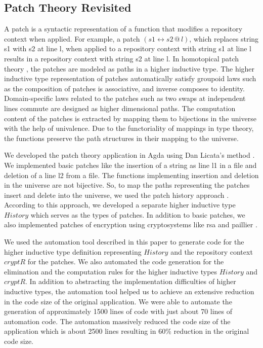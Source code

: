 \documentclass[sigplan,10pt]{acmart}
\begin{document}
\subsection{Patch Theory Revisited}
\label{patch-theory}
A patch is a syntactic representation of a function that modifies a repository context when applied. For example, a patch $(s1 \leftrightarrow s2 \, @ \, l)$, which replaces string s1 with s2 at line l, when applied to a repository context with string s1 at line l results in a repository context with string s2 at line l. In homotopical patch theory \cite{Angiuli-2014}, the patches are modeled as paths in a higher inductive type. The higher inductive type representation of patches automatically satisfy groupoid laws such as the composition of patches is associative, and inverse composes to identity. Domain-specific laws related to the patches such as two swaps at independent lines commute are designed as higher dimensional paths. The computation content of the patches is extracted by mapping them to bijections in the universe with the help of univalence. Due to the functoriality of mappings in type theory, the functions preserve the path structures in their mapping to the universe.

We developed the patch theory application in Agda using Dan Licata's method \cite{Licata-2011}. We implemented basic patches like the insertion of a string as line l1 in a file and deletion of a line l2 from a file. The functions implementing insertion and deletion in the universe are not bijective. So, to map the paths representing the patches insert and delete into the universe, we used the patch history approach \cite{Angiuli-2014}. According to this approach, we developed a separate higher inductive type $History$ which serves as the types of patches. In addition to basic patches, we also implemented patches of encryption using cryptosystems like rsa \cite{Rivest-1978} and paillier \cite{Paillier-1999}.

We used the automation tool described in this paper to generate code for the higher inductive type definition representing $History$ and the repository context $cryptR$ for the patches. We also automated the code generation for the elimination and the computation rules for the higher inductive types $History$ and $cryptR$. In addition to abstracting the implementation difficulties of higher inductive types, the automation tool helped us to achieve an extensive reduction in the code size of the original application. We were able to automate the generation of approximately 1500 lines of code with just about 70 lines of automation code. The automation massively reduced the code size of the application which is about 2500 lines resulting in 60\% reduction in the original code size.
\end{document}
